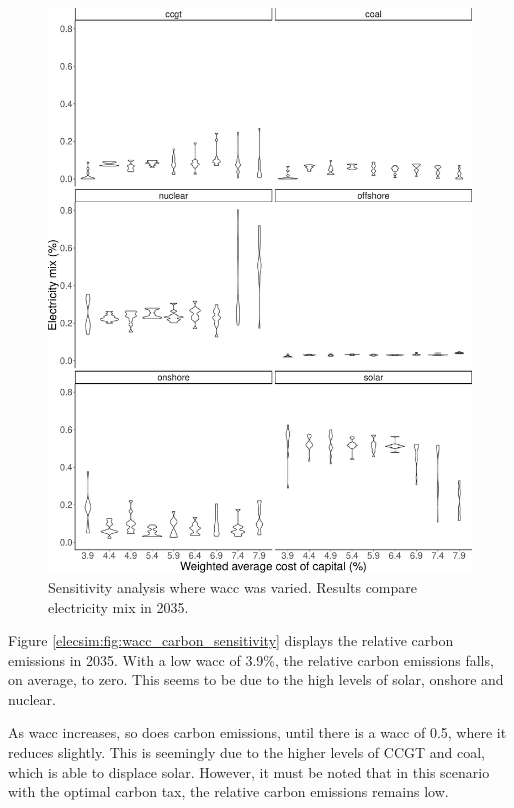 \begin{figure}
	\centering
	\includegraphics[width=0.9\linewidth]{Chapter4/figures/sensitvity_analysis/wacc_sensitivity_analysis.pdf}
	\caption{Sensitivity analysis where \acrfull{wacc} was varied. Results compare electricity mix in 2035.}
	\label{elecsim:fig:wacc_sensitivity}
\end{figure}

Figure \ref{elecsim:fig:wacc_carbon_sensitivity} displays the relative carbon emissions in 2035. With a low \acrshort{wacc} of 3.9\%, the relative carbon emissions falls, on average, to zero. This seems to be due to the high levels of solar, onshore and nuclear.  

As \acrshort{wacc} increases, so does carbon emissions, until there is a \acrshort{wacc} of 0.5, where it reduces slightly. This is seemingly due to the higher levels of CCGT and coal, which is able to displace solar. However, it must be noted that in this scenario with the optimal carbon tax, the relative carbon emissions remains low. 


